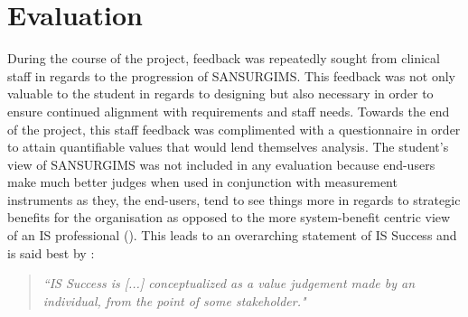 \section{Evaluation}
During the course of the project, feedback was repeatedly sought from clinical staff in regards to the progression of SANSURGIMS. This feedback was not only valuable to the student in regards to designing but also necessary in order to ensure continued alignment with requirements and staff needs. Towards the end of the project, this staff feedback was complimented with a questionnaire in order to attain quantifiable values that would lend themselves analysis. The student's view of SANSURGIMS was not included in any evaluation because end-users make much better judges when used in conjunction with measurement instruments as they, the end-users, tend to see things more in regards to strategic benefits for the organisation as opposed to the more system-benefit centric view of an IS professional (\cite{MiraniLederer}). This leads to an overarching statement of IS Success and is said best by \cite{Seddon}:

\begin{quote}
\center\emph{``IS Success is [...] conceptualized as a value judgement made by an individual, from the point of some stakeholder."}
\end{quote}
\vspace{6mm} 
 
